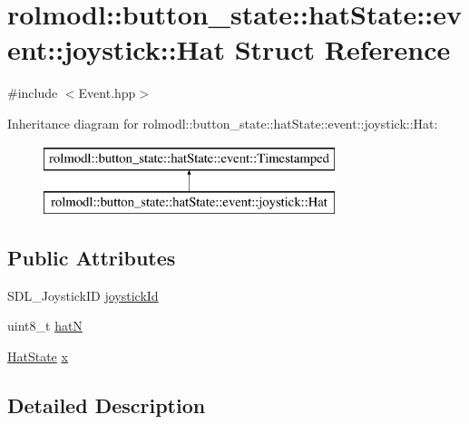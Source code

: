 \hypertarget{structrolmodl_1_1button__state_1_1hat_state_1_1event_1_1joystick_1_1_hat}{}\section{rolmodl\+::button\+\_\+state\+::hat\+State\+::event\+::joystick\+::Hat Struct Reference}
\label{structrolmodl_1_1button__state_1_1hat_state_1_1event_1_1joystick_1_1_hat}


{\ttfamily \#include $<$Event.\+hpp$>$}

Inheritance diagram for rolmodl\+::button\+\_\+state\+::hat\+State\+::event\+::joystick\+::Hat\+:\begin{figure}[H]
\begin{center}
\leavevmode
\includegraphics[height=2.000000cm]{structrolmodl_1_1button__state_1_1hat_state_1_1event_1_1joystick_1_1_hat}
\end{center}
\end{figure}
\subsection*{Public Attributes}
\begin{DoxyCompactItemize}
\item 
S\+D\+L\+\_\+\+Joystick\+ID \mbox{\hyperlink{structrolmodl_1_1button__state_1_1hat_state_1_1event_1_1joystick_1_1_hat_aabdc8dd2c697da8f5240f0d4fc7c6f42}{joystick\+Id}}
\item 
uint8\+\_\+t \mbox{\hyperlink{structrolmodl_1_1button__state_1_1hat_state_1_1event_1_1joystick_1_1_hat_ae69aa8bdf8fdb8079c4f5c74d676b32b}{hatN}}
\item 
\mbox{\hyperlink{structrolmodl_1_1button__state_1_1_hat_state}{Hat\+State}} \mbox{\hyperlink{structrolmodl_1_1button__state_1_1hat_state_1_1event_1_1joystick_1_1_hat_a0d36ed2aa610243644a648aec26cf0fc}{x}}
\end{DoxyCompactItemize}


\subsection{Detailed Description}


